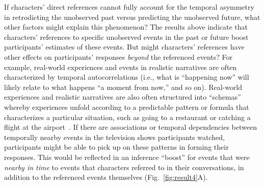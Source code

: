 \documentclass[10pt]{article}
\begin{document}
If characters' direct references cannot fully account for the temporal asymmetry in retrodicting the unobserved past versus predicting the unobserved future, what other factors might explain this phenomenon? The results above indicate that characters’ references to specific unobserved events in the past or future boost participants’ estimates of these events. But might characters' references have other effects on participants' responses \textit{beyond} the referenced events? For example, real-world experiences and events in realistic narratives are often characterized by temporal autocorrelations (i.e., what is ``happening now'' will likely relate to what happens ``a moment from now,'' and so on). Real-world experiences and realistic narratives are also often structured into ``schemas'' whereby experiences unfold according to a predictable pattern or formula that characterizes a particular situation, such as going to a restaurant or catching a flight at the airport~\citep{BaldEtal18}. If there are associations or temporal dependencies between temporally nearby events in the television shows participants watched, participants might be able to pick up on these patterns in forming their responses. This would be reflected in an inference ``boost'' for events that were \textit{nearby in time} to events that characters referred to in their conversations, in addition to the referenced events themselves (Fig.~\ref{fig:result4}A).
\end{document}
